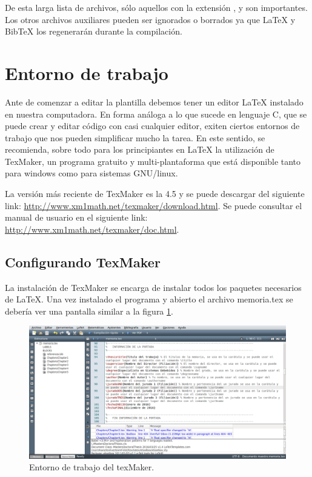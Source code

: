De esta larga lista de archivos, sólo aquellos con la extensión ,  y  son importantes.  Los otros archivos auxiliares pueden ser ignorados o borrados ya que \LaTeX{} y BibTeX los regenerarán durante la compilación.


\section{Entorno de trabajo}

Ante de comenzar a editar la plantilla debemos tener un editor \LaTeX{} instalado en nuestra computadora.  En forma análoga a lo que sucede en lenguaje C, que se puede crear y editar código con casi cualquier editor, exiten ciertos entornos de trabajo que nos pueden simplificar mucho la tarea.  En este sentido, se recomienda, sobre todo para los principiantes en \LaTeX{} la utilización de TexMaker, un programa gratuito y multi-plantaforma que está disponible tanto para windows como para sistemas GNU/linux.

La versión más reciente de TexMaker es la 4.5 y se puede descargar del siguiente link: \url{http://www.xm1math.net/texmaker/download.html}. Se puede consultar el manual de usuario en el siguiente link: \url{http://www.xm1math.net/texmaker/doc.html}.

\subsection{Configurando TexMaker}

La instalación de TexMaker se encarga de instalar todos los paquetes necesarios de \LaTeX{}. 
Una vez instalado el programa y abierto el archivo memoria.tex se debería ver una pantalla similar a la figura \ref{fig:texmaker}. 

\begin{figure}[h]
	\centering
	\includegraphics[width=\textwidth]{./Figures/texmaker.png}
	\caption{Entorno de trabajo del texMaker.}
	\label{fig:texmaker}
\end{figure}

